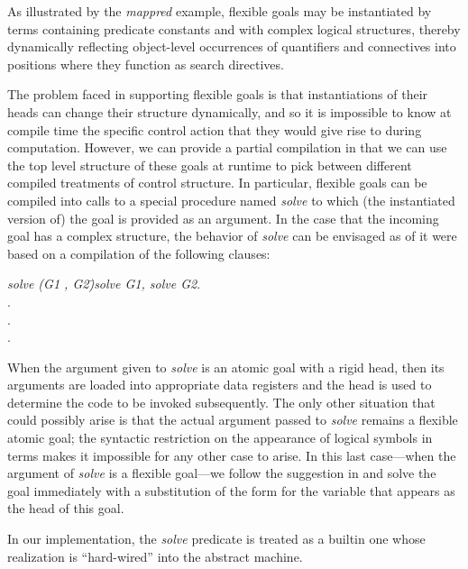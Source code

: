 As illustrated by the {\it mappred} example, flexible goals may be
instantiated by terms containing predicate constants and with complex
logical structures, thereby dynamically
reflecting object-level occurrences of quantifiers and connectives into
positions where they function as search directives.

The problem faced in supporting flexible goals is that instantiations of
their heads can change their structure  dynamically, and so it is
impossible to know at compile time the specific control action that
they would give rise to during computation.
However, we can provide a partial compilation in that we can use the
top level structure of these goals at runtime to pick between
different compiled treatments of control structure. In particular,
flexible goals
can be compiled into calls to a special procedure named {\it solve} to which
(the instantiated version of) the goal is provided as an argument. In the case
that the incoming goal has a complex structure, the behavior of {\it solve}
can be envisaged as of it were based on a compilation of the following
clauses:
\begin{tabbing}
\dquad\dquad\={\it solve (G1 , G2)}\dquad\=\quad\={\it solve G1, solve G2}.\\
\>.\\
\>.\\
\>.
\end{tabbing}
When the argument given to {\it solve} is an atomic goal with a rigid head,
then its arguments are loaded into appropriate data registers and the head is
used to determine the code to be invoked subsequently. The only other situation
that could possibly arise is that the actual argument passed to {\it
  solve} remains a flexible atomic goal; the syntactic restriction on
the appearance of logical symbols in terms makes it impossible for
any other case to arise. In this last case---when the argument of {\it
  solve} is a flexible goal---we follow the suggestion in
\cite{NM98Handbook} and solve the goal immediately with a substitution
of the form  for the variable that
appears as the head of this goal.

In our implementation, the {\it solve} predicate is
treated as a builtin one whose realization is ``hard-wired'' into
the abstract machine.

